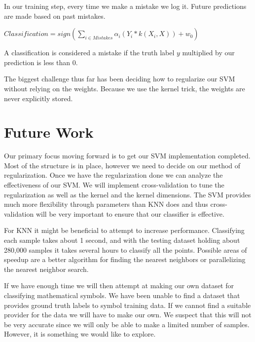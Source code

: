 \documentclass{article} %
\begin{document}
In our training step, every time we make a mistake we log it. Future predictions are made based on past mistakes.

\begin{center}
$Classification = sign(\sum\limits_{i \in Mistakes} {\alpha_i(Y_i * k(X_i, X)) + w_0})$
\end{center}

A classification is considered a mistake if the truth label $y$ multiplied by our prediction is less than 0. 

The biggest challenge thus far has been deciding how to regularize our SVM without relying on the weights. Because we use the kernel trick, the weights are never explicitly stored. 

\section{Future Work}

Our primary focus moving forward is to get our SVM implementation completed. Most of the structure is in place, however we need to decide on our method of regularization. Once we have the regularization done we can analyze the effectiveness of our SVM. We will implement cross-validation to tune the regularization as well as the kernel and the kernel dimensions.  The SVM provides much more flexibility through parameters than KNN does and thus cross-validation will be very important to ensure that our classifier is effective. 

For KNN it might be beneficial to attempt to increase performance. Classifying each sample takes about 1 second, and with the testing dataset holding about 280,000 samples it takes several hours to classify all the points. Possible areas of speedup are a better algorithm for finding the nearest neighbors or parallelizing the nearest neighbor search.

If we have enough time we will then attempt at making our own dataset for classifying mathematical symbols.  We have been unable to find a dataset that provides ground truth labels to symbol training data. If we cannot find a suitable provider for the data we will have to make our own.  We suspect that this will not be very accurate since we will only be able to make a limited number of samples. However, it is something we would like to explore.

\begingroup
\renewcommand{\section}[2]{}%

	
\endgroup
\end{document}
